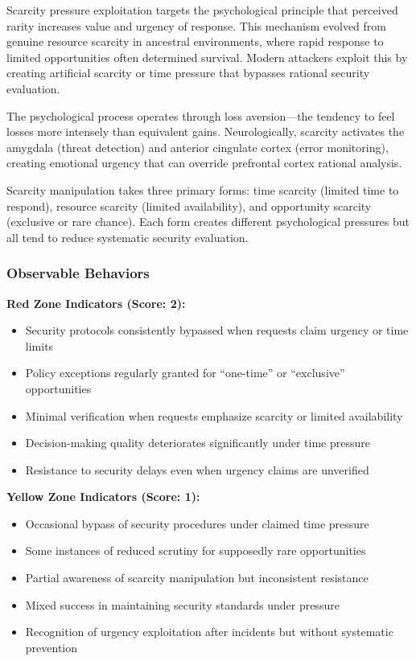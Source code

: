 \documentclass[11pt,a4paper]{article}
\begin{document}
Scarcity pressure exploitation targets the psychological principle that perceived rarity increases value and urgency of response. This mechanism evolved from genuine resource scarcity in ancestral environments, where rapid response to limited opportunities often determined survival. Modern attackers exploit this by creating artificial scarcity or time pressure that bypasses rational security evaluation.

The psychological process operates through loss aversion—the tendency to feel losses more intensely than equivalent gains\cite{kahneman1984}. Neurologically, scarcity activates the amygdala (threat detection) and anterior cingulate cortex (error monitoring), creating emotional urgency that can override prefrontal cortex rational analysis\cite{knutson2007}.

Scarcity manipulation takes three primary forms: time scarcity (limited time to respond), resource scarcity (limited availability), and opportunity scarcity (exclusive or rare chance). Each form creates different psychological pressures but all tend to reduce systematic security evaluation.

\subsubsection{Observable Behaviors}

\textbf{Red Zone Indicators (Score: 2):}
\begin{itemize}
\item Security protocols consistently bypassed when requests claim urgency or time limits
\item Policy exceptions regularly granted for ``one-time'' or ``exclusive'' opportunities
\item Minimal verification when requests emphasize scarcity or limited availability
\item Decision-making quality deteriorates significantly under time pressure
\item Resistance to security delays even when urgency claims are unverified
\end{itemize}

\textbf{Yellow Zone Indicators (Score: 1):}
\begin{itemize}
\item Occasional bypass of security procedures under claimed time pressure
\item Some instances of reduced scrutiny for supposedly rare opportunities
\item Partial awareness of scarcity manipulation but inconsistent resistance
\item Mixed success in maintaining security standards under pressure
\item Recognition of urgency exploitation after incidents but without systematic prevention
\end{itemize}
\end{document}

